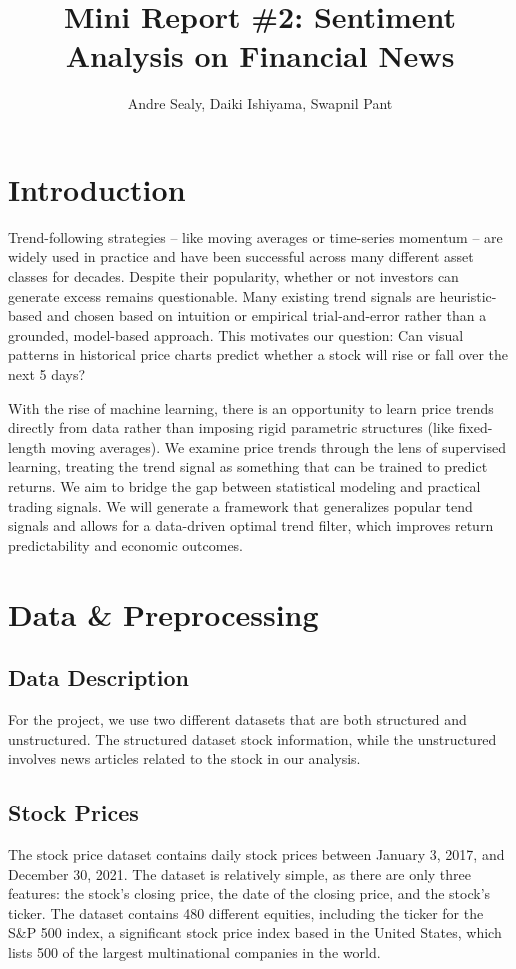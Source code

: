 \documentclass[12pt]{article}
\title{Mini Report \#2: Sentiment Analysis on Financial News}
\author{Andre Sealy, Daiki Ishiyama, Swapnil Pant}
\begin{document}
	
\maketitle

\section*{Introduction}

Trend-following strategies -- like moving averages or time-series momentum -- are widely used in practice and have been successful across many different asset classes for decades. Despite their popularity, whether or not investors can generate excess remains questionable. Many existing trend signals are heuristic-based and chosen based on intuition or empirical trial-and-error rather than a grounded, model-based approach. This motivates our question:  Can visual patterns in historical price charts predict whether a stock will rise or fall over the next 5 days?

With the rise of machine learning, there is an opportunity to learn price trends directly from data rather than imposing rigid parametric structures (like fixed-length moving averages). We examine price trends through the lens of supervised learning, treating the trend signal as something that can be trained to predict returns. We aim to bridge the gap between statistical modeling and practical trading signals. We will generate a framework that generalizes popular tend signals and allows for a data-driven optimal trend filter, which improves return predictability and economic outcomes.

\section*{Data \& Preprocessing}
\subsection*{Data Description}

For the project, we use two different datasets that are both structured and unstructured. The structured dataset stock information, while the unstructured involves news articles related to the stock in our analysis.

\subsection*{Stock Prices}

The stock price dataset contains daily stock prices between January 3, 2017, and December 30, 2021. The dataset is relatively simple, as there are only three features: the stock's closing price, the date of the closing price, and the stock's ticker. The dataset contains 480 different equities, including the ticker for the S\&P 500 index, a significant stock price index based in the United States, which lists 500 of the largest multinational companies in the world.
\end{document}
